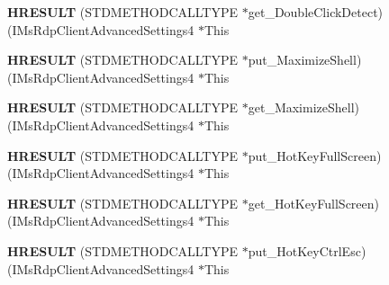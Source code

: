 \begin{DoxyCompactItemize}
\item 
\mbox{\label{struct_i_ms_rdp_client_advanced_settings4_vtbl_a9bbc7be2d8bbcb89e35034ef6fe9a344}} 
{\bfseries H\+R\+E\+S\+U\+LT} (S\+T\+D\+M\+E\+T\+H\+O\+D\+C\+A\+L\+L\+T\+Y\+PE $\ast$get\+\_\+\+Double\+Click\+Detect)(I\+Ms\+Rdp\+Client\+Advanced\+Settings4 $\ast$This
\item 
\mbox{\label{struct_i_ms_rdp_client_advanced_settings4_vtbl_a3d77e099d41ecb3942cc3b1bd7a618e9}} 
{\bfseries H\+R\+E\+S\+U\+LT} (S\+T\+D\+M\+E\+T\+H\+O\+D\+C\+A\+L\+L\+T\+Y\+PE $\ast$put\+\_\+\+Maximize\+Shell)(I\+Ms\+Rdp\+Client\+Advanced\+Settings4 $\ast$This
\item 
\mbox{\label{struct_i_ms_rdp_client_advanced_settings4_vtbl_ad238dcfa3e3c2f073e8c587d4dc0f1ee}} 
{\bfseries H\+R\+E\+S\+U\+LT} (S\+T\+D\+M\+E\+T\+H\+O\+D\+C\+A\+L\+L\+T\+Y\+PE $\ast$get\+\_\+\+Maximize\+Shell)(I\+Ms\+Rdp\+Client\+Advanced\+Settings4 $\ast$This
\item 
\mbox{\label{struct_i_ms_rdp_client_advanced_settings4_vtbl_a7042c582f47cd84fef46646466cf0927}} 
{\bfseries H\+R\+E\+S\+U\+LT} (S\+T\+D\+M\+E\+T\+H\+O\+D\+C\+A\+L\+L\+T\+Y\+PE $\ast$put\+\_\+\+Hot\+Key\+Full\+Screen)(I\+Ms\+Rdp\+Client\+Advanced\+Settings4 $\ast$This
\item 
\mbox{\label{struct_i_ms_rdp_client_advanced_settings4_vtbl_ab828bf0eac590537c3b0c709a866e45a}} 
{\bfseries H\+R\+E\+S\+U\+LT} (S\+T\+D\+M\+E\+T\+H\+O\+D\+C\+A\+L\+L\+T\+Y\+PE $\ast$get\+\_\+\+Hot\+Key\+Full\+Screen)(I\+Ms\+Rdp\+Client\+Advanced\+Settings4 $\ast$This
\item 
\mbox{\label{struct_i_ms_rdp_client_advanced_settings4_vtbl_ad2db7cfdcb40ba3de53818c67d387c10}} 
{\bfseries H\+R\+E\+S\+U\+LT} (S\+T\+D\+M\+E\+T\+H\+O\+D\+C\+A\+L\+L\+T\+Y\+PE $\ast$put\+\_\+\+Hot\+Key\+Ctrl\+Esc)(I\+Ms\+Rdp\+Client\+Advanced\+Settings4 $\ast$This
\item 
\mbox{\label{struct_i_ms_rdp_client_advanced_settings4_vtbl_a8eb6bf4cc5183e4e673c97b05b035633}} 

\end{DoxyCompactItemize}
